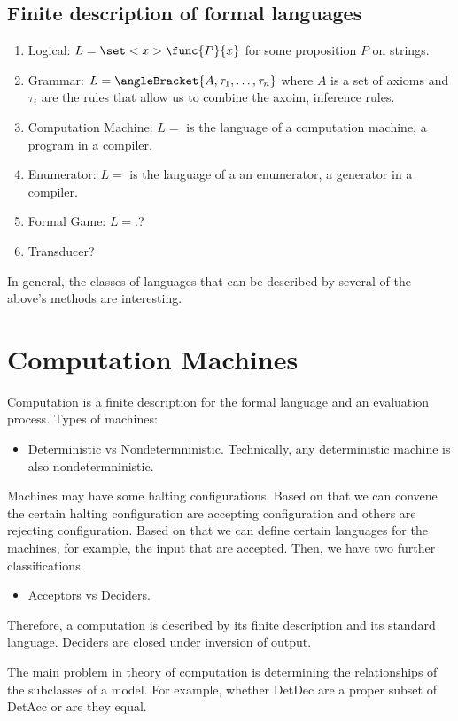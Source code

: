 \subsection{Finite description of formal languages}
\begin{enumerate}
    \item Logical: \(L = \set<x>{\func{P}{x}}\) for some proposition \(P\) on strings.
    \item Grammar: \(L = \angleBracket{A,\tau_1, \dots, \tau_n}\) where \(A\) is a set of axioms and \(\tau_i\) are the rules that allow us to combine the axoim, inference rules.
    \item Computation Machine: \(L = \) is the language of a computation machine, a program in a compiler.
    \item Enumerator: \(L = \) is the language of a an enumerator, a generator in a compiler.
    \item Formal Game: \(L = \).?
    \item Transducer?
\end{enumerate}
In general, the classes of languages that can be described by several of the above's methods are interesting.


\section{Computation Machines}

Computation is a finite description for the formal language and an evaluation process.
Types of machines:
\begin{itemize}
    \item Deterministic vs Nondetermninistic. Technically, any deterministic machine is also nondetermninistic.
\end{itemize}
Machines may have some halting configurations. Based on that we can convene the certain halting configuration are accepting configuration and others are rejecting configuration. Based on that we can define certain languages for the machines, for example, the input that are accepted. Then, we have two further classifications.
\begin{itemize}
    \item Acceptors vs Deciders.
\end{itemize}

Therefore, a computation is described by its finite description and its standard language.
Deciders are closed under inversion of output.

The main problem in theory of computation is determining the relationships of the subclasses of a model. For example, whether DetDec are a proper subset of DetAcc or are they equal. 


